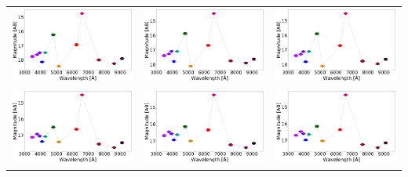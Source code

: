 \begin{table}
\begin{tabular}{ccc}
\includegraphics[width=0.3\linewidth, clip]{photopectrum_splus_MC0093-295870_aper.pdf} & \includegraphics[width=0.3\linewidth, clip]{photopectrum_splus_MC0093-295870_auto.pdf} & \includegraphics[width=0.3\linewidth, clip]{photopectrum_splus_MC0093-295870_petro.pdf} \\
\includegraphics[width=0.3\linewidth, clip]{photopectrum_splus_MC0094-194143_aper.pdf} & \includegraphics[width=0.3\linewidth, clip]{photopectrum_splus_MC0094-194143_auto.pdf} & \includegraphics[width=0.3\linewidth, clip]{photopectrum_splus_MC0094-194143_petro.pdf} \\

\end{tabular}
\end{table}
